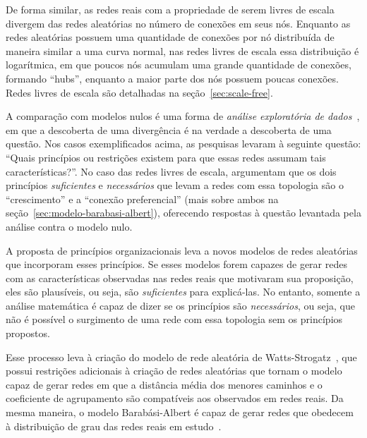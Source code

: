 \documentclass[12pt,a4paper]{article}
\theoremstyle{hypo}
\begin{document}

De forma similar, as redes reais com a propriedade de serem livres de escala divergem das redes aleatórias no número de conexões em seus nós. Enquanto as redes aleatórias possuem uma quantidade de conexões por nó distribuída de maneira similar a uma curva normal, nas redes livres de escala essa distribuição é logarítmica, em que poucos nós acumulam uma grande quantidade de conexões, formando \enquote{hubs}, enquanto a maior parte dos nós possuem poucas conexões. Redes livres de escala são detalhadas na seção~\ref{sec:scale-free}.

A comparação com modelos nulos é uma forma de \textit{análise exploratória de dados}~\cite{Zweig2016-rb}, em que a descoberta de uma divergência é na verdade a descoberta de uma questão. Nos casos exemplificados acima, as pesquisas levaram à seguinte questão: \enquote{Quais princípios ou restrições existem para que essas redes assumam tais características?}. No caso das redes livres de escala,  argumentam que os dois princípios  \textit{suficientes} e \textit{necessários} que levam a redes com essa topologia são o \enquote{crescimento} e a \enquote{conexão preferencial} (mais sobre ambos na seção~\ref{sec:modelo-barabasi-albert}), oferecendo respostas à questão levantada pela análise contra o modelo nulo.

A proposta de princípios organizacionais leva a novos modelos de redes aleatórias que incorporam esses princípios. Se esses modelos forem capazes de gerar redes com as características observadas nas redes reais que motivaram sua proposição, eles são plausíveis, ou seja, são \textit{suficientes} para explicá-las. No entanto, somente a análise matemática é capaz de dizer se os princípios são \textit{necessários}, ou seja, que não é possível o surgimento de uma rede com essa topologia sem os princípios propostos.

Esse processo leva à criação do modelo de rede aleatória de Watts-Strogatz~\cite{Watts1998-wt}, que possui restrições adicionais à criação de redes aleatórias que tornam o modelo capaz de gerar redes em que a distância média dos menores caminhos e o coeficiente de agrupamento são compatíveis aos observados em redes reais. Da mesma maneira, o modelo Barabási-Albert é capaz de gerar redes que obedecem à distribuição de grau das redes reais em estudo~\cite{Barabasi1999-sn}.
\end{document}
